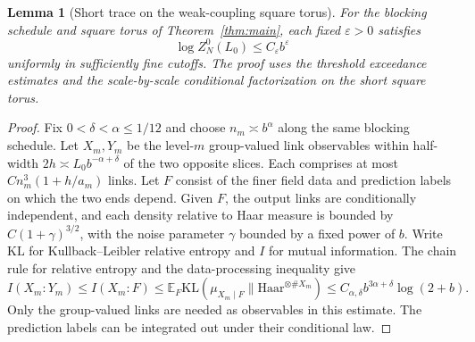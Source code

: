 \documentclass[11pt,a4paper]{article}
\newtheorem{lemma}[theorem]{Lemma}
\numberwithin{equation}{section}
\begin{document}
\begin{lemma}[Short trace on the weak-coupling square torus]\label{cam-bound-entropy}
For the blocking schedule and square torus of Theorem~\ref{thm:main}, each fixed \(\varepsilon>0\) satisfies
\[
 \log Z_N^0(L_0)\le C_\varepsilon b^\varepsilon
\]
uniformly in sufficiently fine cutoffs. The proof uses the threshold exceedance estimates and the scale-by-scale conditional factorization on the short square torus.
\end{lemma}
\begin{proof}
Fix \(0<\delta<\alpha\le1/12\) and choose \(n_m\asymp b^\alpha\) along the same blocking schedule. Let \(X_m,Y_m\) be the level-\(m\) group-valued link observables within half-width \(2h\asymp L_0b^{-\alpha+\delta}\) of the two opposite slices. Each comprises at most \(C n_m^3(1+h/a_m)\) links. Let \(F\) consist of the finer field data and prediction labels on which the two ends depend. Given \(F\), the output links are conditionally independent, and each density relative to Haar measure is bounded by \(C(1+\gamma)^{3/2}\), with the noise parameter \(\gamma\) bounded by a fixed power of \(b\). Write \(\mathrm{KL}\) for Kullback--Leibler relative entropy and \(I\) for mutual information. The chain rule for relative entropy and the data-processing inequality give
\[
 I(X_m:Y_m)\le I(X_m:F)
 \le \mathbb E_F\mathrm{KL}(\mu_{X_m\mid F}\|\mathrm{Haar}^{\otimes \#X_m})
 \le C_{\alpha,\delta} b^{3\alpha+\delta}\log(2+b).
\]
Only the group-valued links are needed as observables in this estimate. The prediction labels can be integrated out under their conditional law.


\end{proof}
\end{document}

